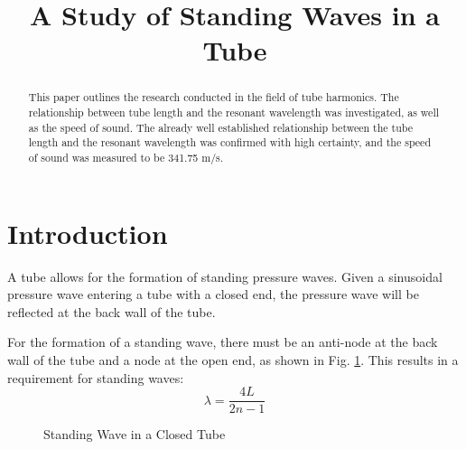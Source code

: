\documentclass[conference]{IEEEtran}
\begin{document}
\title{A Study of Standing Waves in a Tube}

\author{
}

\maketitle

\begin{abstract}
    This paper outlines the research conducted in the field of tube harmonics.
    The relationship between tube length and the resonant wavelength was
    investigated, as well as the speed of sound. The already well established
    relationship between the tube length and the resonant wavelength was
    confirmed with high certainty, and the speed of sound was measured to be
    341.75 m/s.
\end{abstract}

\section{Introduction}

A tube allows for the formation of standing pressure waves. Given a sinusoidal
pressure wave entering a tube with a closed end, the pressure wave will be
reflected at the back wall of the tube.

For the formation of a standing wave, there must be an anti-node at the back
wall of the tube and a node at the open end, as shown in Fig.
\ref{fig:tube-diagram}. This results in a requirement for standing waves:
\begin{equation}\label{eqn:base}
    \lambda = \frac{4L}{2n - 1}
\end{equation}

\begin{figure}[b!]
    \centering
    \caption{Standing Wave in a Closed Tube}
    \label{fig:tube-diagram}
\end{figure}
\end{document}
